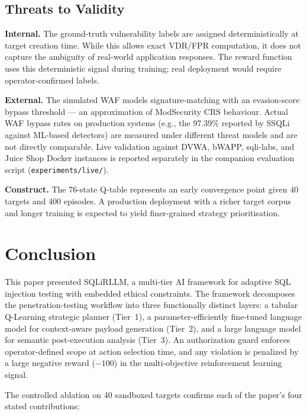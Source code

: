 \subsection{Threats to Validity}

\noindent\textbf{Internal.} The ground-truth vulnerability labels are
assigned deterministically at target creation time. While this allows exact
VDR/FPR computation, it does not capture the ambiguity of real-world
application responses. The reward function uses this deterministic signal
during training; real deployment would require operator-confirmed labels.

\noindent\textbf{External.} The simulated WAF models signature-matching with
an evasion-score bypass threshold — an approximation of ModSecurity CRS
behaviour. Actual WAF bypass rates on production systems (e.g., the 97.39\%
reported by SSQLi~\cite{guan2023ssqli} against ML-based detectors) are measured
under different threat models and are not directly comparable. Live validation
against DVWA, bWAPP, sqli-labs, and Juice Shop Docker instances is reported
separately in the companion evaluation script (\texttt{experiments/live/}).

\noindent\textbf{Construct.} The 76-state Q-table represents an early
convergence point given 40 targets and 400 episodes. A production deployment
with a richer target corpus and longer training is expected to yield finer-grained
strategy prioritisation.

\section{Conclusion}

This paper presented SQLiRLLM, a multi-tier AI framework for adaptive SQL
injection testing with embedded ethical constraints. The framework decomposes
the penetration-testing workflow into three functionally distinct layers: a
tabular Q-Learning strategic planner (Tier~1), a parameter-efficiently
fine-tuned language model for context-aware payload generation (Tier~2), and a
large language model for semantic post-execution analysis (Tier~3). An
authorization guard enforces operator-defined scope at action selection time,
and any violation is penalized by a large negative reward ($-100$) in the
multi-objective reinforcement learning signal.

The controlled ablation on 40 sandboxed targets confirms each of the paper's
four stated contributions:

